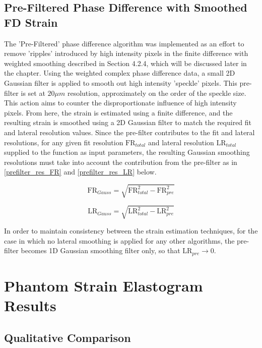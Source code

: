 \subsection{Pre-Filtered Phase Difference with Smoothed FD Strain}
The 'Pre-Filtered' phase difference algorithm was implemented as an effort to remove 'ripples' introduced by high intensity pixels in the finite difference with weighted smoothing described in Section 4.2.4, which will be discussed later in the chapter. Using the weighted complex phase difference data, a small 2D Gaussian filter is applied to smooth out high intensity 'speckle' pixels. This pre-filter is set at $20 \mu m$ resolution, approximately on the order of the speckle size. This action aims to counter the disproportionate influence of high intensity pixels. From here, the strain is estimated using a finite difference, and the resulting strain is smoothed using a 2D Gaussian filter to match the required fit and lateral resolution values. Since the pre-filter contributes to the fit and lateral resolutions, for any given fit resolution $\text{FR}_{total}$ and lateral resolution $\text{LR}_{total}$ supplied to the function as input parameters, the resulting Gaussian smoothing resolutions must take into account the contribution from the pre-filter as in \autoref{prefilter_res_FR} and \autoref{prefilter_res_LR} below.

\begin{equation}
	\text{FR}_{Gauss} = \sqrt{\text{FR}_{total}^2 - \text{FR}_{pre}^2}
    \label{prefilter_res_FR}
\end{equation}

\begin{equation}
    \text{LR}_{Gauss} = \sqrt{\text{LR}_{total}^2 - \text{LR}_{pre}^2}
    \label{prefilter_res_LR}
\end{equation}

In order to maintain consistency between the strain estimation techniques, for the case in which no lateral smoothing is applied for any other algorithms, the pre-filter becomes 1D Gaussian smoothing filter only, so that $\text{LR}_{pre}\rightarrow 0$. 

\section{Phantom Strain Elastogram Results}\label{phantom_results}

\subsection{Qualitative Comparison}

